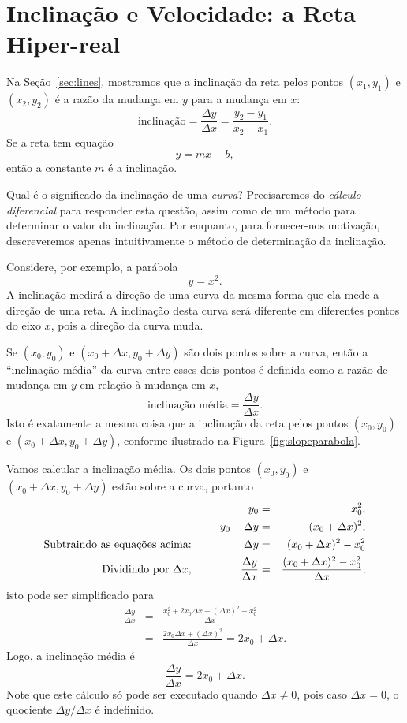 \section{Inclinação e Velocidade: a Reta Hiper-real}
\label{sec:hyperrealline}

Na Seção~\ref{sec:lines}, mostramos que a inclinação da reta pelos pontos
$(x_1, y_1)$ e $(x_2, y_2)$ é a razão da mudança em $y$ para a
mudança em $x$:
\[
  \text{inclinação} = \frac{\Delta y}{\Delta x} = \frac{y_2 - y_1}{x_2 - x_1}.
\]
Se a reta tem equação
\[
  y = mx+b,
\]
então a constante $m$ é a inclinação.

Qual é o significado da inclinação de uma \emph{curva}? Precisaremos
do \emph{cálculo diferencial} para responder esta questão, assim como
de um método para determinar o valor da inclinação.
Por enquanto, para fornecer-nos motivação, descreveremos apenas
intuitivamente o método de determinação da inclinação.

Considere, por exemplo, a parábola
\[
  y = x^2.
\]
A inclinação medirá a direção de uma curva da mesma forma que ela
mede a direção de uma reta. A inclinação desta curva será diferente
em diferentes pontos do eixo $x$, pois a direção da curva muda.

Se $(x_0,y_0)$ e $(x_0 + \Delta x, y_0 + \Delta y)$ são dois pontos
sobre a curva, então a ``inclinação média'' da curva entre esses
dois pontos é definida como a razão de mudança em $y$ em relação
à mudança em $x$,
\[
  \text{inclinação média} = \frac{\Delta y}{\Delta x}.
\]
Isto é exatamente a mesma coisa que a inclinação da reta pelos pontos
$(x_0,y_0)$ e $(x_0 + \Delta x, y_0 + \Delta y)$, conforme
ilustrado na Figura~\ref{fig:slopeparabola}.


Vamos calcular a inclinação média. Os dois pontos $(x_0, y_0)$ e
$(x_0 + \Delta x, y_0 + \Delta y)$ estão sobre a curva, portanto
\begin{eqnarray*}
                         y_0 & = & x_0^2, \\
              y_0 + \Delta y & = & (x_0 + \Delta x)^2, \\
\text{Subtraindo as equações acima: } \hspace{10ex}
                    \Delta y & = & (x_0 + \Delta x)^2 - x_0^2 \\
\text{Dividindo por } \Delta x, \hspace{10ex}
   \frac{\Delta y}{\Delta x} & = & \frac{(x_0 + \Delta x)^2 - x_0^2}%
                                        {\Delta x},
\end{eqnarray*}
isto pode ser simplificado para
\begin{eqnarray*}
  \frac{\Delta y}{\Delta x}  & = & 
             \frac{x_0^2 + 2 x_0 \Delta x + (\Delta x)^2 - x_0^2}%
                  {\Delta x} \\
                             & = &
             \frac{2 x_0 \Delta x + (\Delta x)^2}%
                  {\Delta x} = 2x_0 + \Delta x.
\end{eqnarray*}
Logo, a inclinação média é
\[
  \frac{\Delta y}{\Delta x} = 2x_0 + \Delta x.
\]
Note que este cálculo só pode ser executado quando $\Delta x \ne 0$, pois
caso $\Delta x = 0$, o quociente $\Delta y / \Delta x$ é indefinido.

